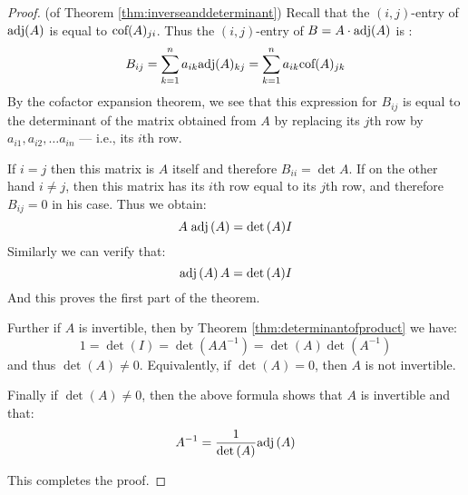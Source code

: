 \begin{proof} (of Theorem \ref{thm:inverseanddeterminant})
Recall that the $(i,j)$-entry of $\mbox{adj}(A)$ is equal to $\mbox{cof}(A)_{ji}$.  Thus the $(i,j)$-entry of   $B=A\cdot \mbox{adj}(A)$ is : 
\[
B_{ij}=\sum_{k=1}^n a_{ik} \mbox{adj} (A)_{kj}= \sum_{k=1}^n a_{ik} \mbox{cof} (A)_{jk}
\]
By the cofactor expansion theorem, we see that this expression for $B_{ij}$ is equal to the determinant of the
matrix obtained from $A$ by replacing its $j$th  row  by $a_{i1}, a_{i2}, \dots a_{in}$ --- i.e., its $i$th row. 

If $i=j$ then this matrix is $A$ itself and therefore $B_{ii}=\det
A$. If on the other hand $i\neq j$, then this matrix has its $i$th row
equal to its $j$th row, and therefore $B_{ij}=0$ in his case. Thus we obtain: 
\begin{equation*}
A \; \mbox{adj}\left(A\right) = {\det \left(A\right)} I
\end{equation*}
Similarly we can verify that:
\begin{equation*}
\mbox{adj}\left(A\right)A = {\det \left(A\right)} I
\end{equation*}
And this proves the first part of the theorem. 

Further if $A$ is  invertible, then by Theorem \ref{thm:determinantofproduct} we have:
\[ 1 = \det \left( I \right) = \det \left( A A^{-1} \right) = \det \left( A \right) \det \left( A^{-1} \right) \]
and thus $\det \left( A \right) \neq 0$. Equivalently, if  $\det \left( A \right) = 0$, then $A$ is not invertible. 

Finally if $\det \left( A \right) \neq 0$, then the above formula shows that $A$ is invertible and that:
\begin{equation*}
A^{-1} = \frac{1}{\det \left(A\right)} \mbox{adj}\left(A\right)
\end{equation*}

This completes the proof.
\end{proof}


